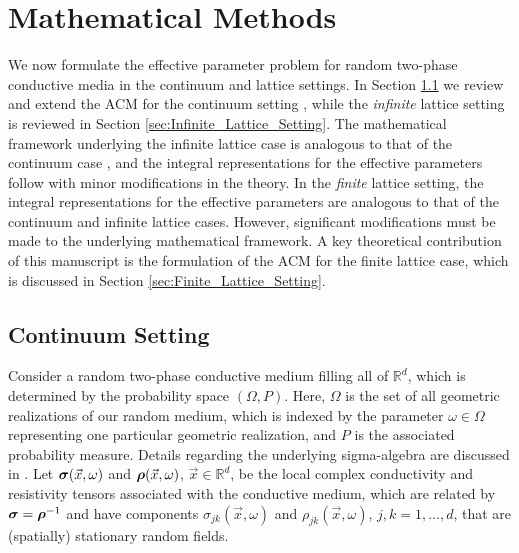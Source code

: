 \documentclass{cmslatex}
\newcommand\bsig{\mbox{\boldmath${\sigma}$}}
\newcommand\brho{\mbox{\boldmath${\rho}$}}
\begin{document}
\section{Mathematical Methods}\label{sec:Mathematical_Methods} 
%
We now formulate the effective parameter problem for random
two-phase conductive media in the continuum and lattice
settings. In Section \ref{sec:Continuum_Setting} we review and extend
the ACM for the continuum setting \cite{Golden:CMP-473}, while the
\emph{infinite} 
lattice setting \cite{Bruno:JSP-365,Golden:CMP-467} is reviewed in
Section \ref{sec:Infinite_Lattice_Setting}. The mathematical framework
underlying the infinite lattice case is analogous to that of
the continuum case \cite{Bruno:JSP-365}, and the integral
representations for the effective parameters follow with minor
modifications in the theory. In the \emph{finite} lattice setting, the
integral representations for the effective parameters are analogous to
that of the continuum and infinite lattice cases. However,
significant modifications must be made to the underlying mathematical
framework. A key theoretical contribution of this manuscript is the
formulation of the ACM for the finite lattice case, which is discussed
in Section \ref{sec:Finite_Lattice_Setting}.  


\subsection{Continuum Setting}\label{sec:Continuum_Setting}
%
Consider a random two-phase conductive medium filling all of
$\mathbb{R}^d$, which is determined by the probability space
$(\Omega,P)$. Here, $\Omega$ is the set of all  geometric realizations of our
random medium, which is indexed by the parameter $\omega\in\Omega$ representing
one particular geometric realization, and $P$ is the associated
probability measure. Details regarding the underlying sigma-algebra
are discussed in \cite{Papanicolaou:RF-835}. Let $\bsig(\vec{x},\omega)$
and $\brho(\vec{x},\omega)$, $\vec{x}\in\mathbb{R}^d$, be the local complex
conductivity and resistivity tensors associated with the conductive
medium, which are related by $\bsig=\brho^{-1}$ and have components
$\sigma_{jk}(\vec{x},\omega)$ and $\rho_{jk}(\vec{x},\omega)$, $j,k=1,\ldots,d$, that are
(spatially) stationary random fields. 
\end{document}
